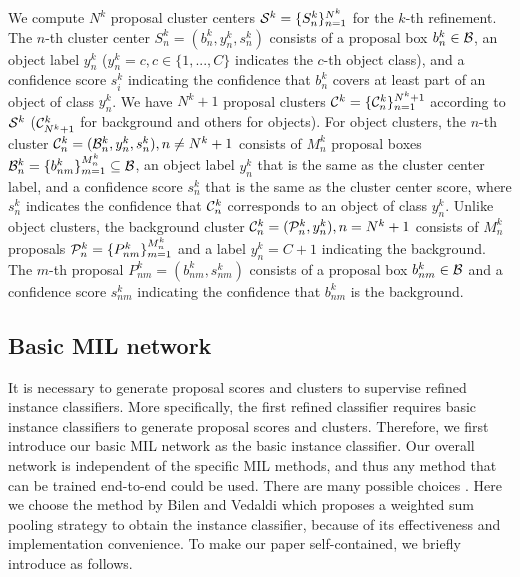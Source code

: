 \documentclass[10pt,journal,compsoc]{IEEEtran}
\begin{document}
We compute $N^{k}$ proposal cluster centers ${\cal S}^{k} = \{S^{k}_{n}\}_{n=1}^{N^{k}}$ for the $k$-th refinement.
The $n$-th cluster center $S^{k}_{n} = (b^{k}_{n}, y^{k}_{n}, s^{k}_{n})$ consists of
a proposal box $b^{k}_{n} \in {\cal B}$,
an object label $y^{k}_{n}$ ($y^{k}_{n} = c, c \in \{1, ..., C\}$ indicates the $c$-th object class),
and a confidence score $s^{k}_{i}$ indicating the confidence that $b^{k}_{n}$ covers at least part of an object of class $y^{k}_{n}$.
We have $N^{k}+1$ proposal clusters ${\cal C}^{k} = \{{\cal C}^{k}_{n}\}_{n=1}^{N^{k}+1}$ according to ${\cal S}^{k}$
(${\cal C}^{k}_{N^{k}+1}$ for background and others for objects).
For object clusters,
the $n$-th cluster ${\cal C}^{k}_{n} = ({\cal B}^{k}_{n}, y^{k}_{n}, s^{k}_{n}), n \neq N^{k}+1$
consists of $M^{k}_{n}$ proposal boxes ${\cal B}^{k}_{n} = \{b^{k}_{nm}\}_{m=1}^{M^{k}_{n}} \subseteq {\cal B}$,
an object label $y^{k}_{n}$ that is the same as the cluster center label,
and a confidence score $s^{k}_{n}$ that is the same as the cluster center score,
where $s^{k}_{n}$ indicates the confidence that ${\cal C}^{k}_{n}$ corresponds to an object of class $y^{k}_{n}$.
Unlike object clusters,
the background cluster ${\cal C}^{k}_{n} = ({\cal P}^{k}_{n}, y^{k}_{n}), n = N^{k}+1$
consists of $M^{k}_{n}$ proposals ${\cal P}^{k}_{n} = \{P^{k}_{nm}\}_{m=1}^{M^{k}_{n}}$
and a label $y^{k}_{n} = C + 1$ indicating the background.
The $m$-th proposal $P^{k}_{nm} = (b^{k}_{nm}, s^{k}_{nm})$ consists of a proposal box $b^{k}_{nm} \in {\cal B}$
and a confidence score $s^{k}_{nm}$ indicating the confidence that $b^{k}_{nm}$ is the background.




\subsection{Basic MIL network}
\label{sec:mil}

It is necessary to generate proposal scores and clusters to supervise refined instance classifiers.
More specifically, the first refined classifier requires basic instance classifiers to generate proposal scores and clusters.
Therefore, we first introduce our basic MIL network as the basic instance classifier.
Our overall network is independent of the specific MIL methods,
and thus any method that can be trained end-to-end could be used.
There are many possible choices \cite{Ref:Tang2017deep,Ref:Bilen2016,Ref:Kantorov2016}.
Here we choose the method by Bilen and Vedaldi \cite{Ref:Bilen2016} which proposes a weighted sum pooling strategy to obtain the instance classifier,
because of its effectiveness and implementation convenience.
{To make our paper self-contained,
we briefly introduce \cite{Ref:Bilen2016} as follows.
}
\end{document}
